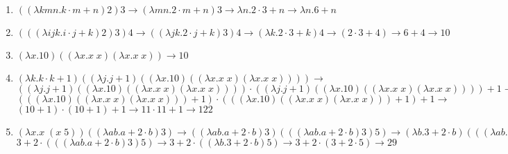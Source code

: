 \documentclass[a4paper]{article}
\begin{document}
\begin{enumerate}
\begin{enumerate}
\item $((\lambda kmn.k \cdot m+n)2)3 \rightarrow
(\lambda mn.2 \cdot m+n)3 \rightarrow \lambda n.2 \cdot 3+n \rightarrow 
\lambda n.6+n$ \vspace*{4mm}\\

\item $(((\lambda ijk.i \cdot j+k)2)3)4 \rightarrow
((\lambda jk.2 \cdot j+k)3)4 \rightarrow (\lambda k.2 \cdot 3+k)4 \rightarrow
(2 \cdot 3+4) \rightarrow 6 + 4 \rightarrow 10$ \vspace*{4mm}\\

\item $(\lambda x.10)((\lambda x. x \; x)(\lambda x. x \; x)) \rightarrow 10$
\vspace*{4mm}\\

\item $(\lambda k.k \cdot k+1)((\lambda j.j+1)((\lambda x.10)((\lambda x. x \; x)(\lambda x. x \; x)))) \rightarrow $ \vspace*{3mm}\\
$((\lambda j.j+1)((\lambda x.10)((\lambda x. x \; x)(\lambda x. x \; x)))) \cdot 
((\lambda j.j+1)((\lambda x.10)((\lambda x. x \; x)(\lambda x. x \; x)))) + 1
\rightarrow $ \vspace*{3mm}\\
$ (((\lambda x.10)((\lambda x. x \; x)(\lambda x. x \; x)))+1) \cdot
(((\lambda x.10)((\lambda x. x \; x)(\lambda x. x \; x)))+1) + 1 \rightarrow$
\vspace*{3mm}\\
$ (10+1) \cdot (10+1) +1 \rightarrow 11 \cdot 11 + 1 \rightarrow 122 $
\vspace*{4mm}\\

\item $(\lambda x.x \; (x \; 5))((\lambda ab.a+2\cdot b)3) \rightarrow
((\lambda ab.a+2\cdot b)3)(((\lambda ab.a+2\cdot b)3)5) \rightarrow
(\lambda b.3+2\cdot b)(((\lambda ab.a+2\cdot b)3)5) \rightarrow$ \vspace*{3mm}\\
$ 3 + 2 \cdot (((\lambda ab.a+2\cdot b)3)5) \rightarrow
3 + 2 \cdot ((\lambda b.3+2 \cdot b)5) \rightarrow
3 + 2 \cdot (3+2 \cdot 5) \rightarrow 29$ \vspace*{4mm}\\


\end{enumerate}
\end{enumerate}
\end{document}
